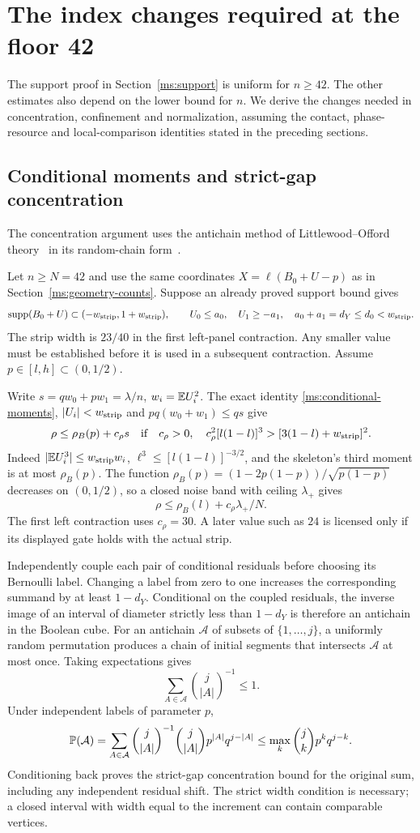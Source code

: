 \section{The index changes required at the floor 42}\label{ms:uniform-bridge}

The support proof in Section~\ref{ms:support} is uniform for $n\ge42$.
The other estimates also depend on the lower bound for $n$. We derive
the changes needed in concentration, confinement and normalization,
assuming the contact, phase-resource and local-comparison identities
stated in the preceding sections.

\subsection{Conditional moments and strict-gap concentration}
The concentration argument uses the antichain method of
Littlewood--Offord theory~\cite{Erdos1945} in its random-chain
form~\cite{Lubell1966}.

Let $n\ge N=42$ and use the same coordinates
$X=\ell(B_0+U-p)$ as in Section~\ref{ms:geometry-counts}. Suppose an
already proved support bound gives
\[
 \operatorname{supp}(B_0+U)\subset(-w_{\rm strip},1+w_{\rm strip}),\qquad
 U_0\le a_0,\quad U_1\ge-a_1,\quad
 a_0+a_1=d_Y\le d_0<w_{\rm strip}.
\]
The strip width is $23/40$ in the first left-panel contraction.
Any smaller value must be established before it is used in a subsequent
contraction. Assume $p\in[l,h]\subset(0,1/2)$.

Write $s=qw_0+pw_1=\lambda/n$, $w_i=\mathbb E U_i^2$. The exact identity
\eqref{ms:conditional-moments}, $|U_i|<w_{\rm strip}$ and $pq(w_0+w_1)\le qs$
give
\[
 \rho\le\rho_B(p)+c_\rho s
 \quad\hbox{if}\quad
 c_\rho>0,\quad c_\rho^2[l(1-l)]^3>[3(1-l)+w_{\rm strip}]^2.
\]
Indeed $|\mathbb E U_i^3|\le w_{\rm strip} w_i$,
$\ell^3\le[l(1-l)]^{-3/2}$, and the skeleton's third moment is at
most $\rho_B(p)$. The function $\rho_B(p)=(1-2p(1-p))/\sqrt{p(1-p)}$
decreases on $(0,1/2)$, so a closed noise band with ceiling
$\lambda_+$ gives
\[
 \rho\le\rho_B(l)+c_\rho\lambda_+/N.
\]
The first left contraction uses $c_\rho=30$. A later value such as $24$
is licensed only if its displayed gate holds with the actual strip.

Independently couple each pair of conditional residuals before choosing
its Bernoulli label. Changing a label from zero to one increases the
corresponding summand by at least $1-d_Y$. Conditional on the coupled
residuals, the inverse image of an interval of diameter strictly less
than $1-d_Y$ is therefore an antichain in the Boolean cube. For an
antichain $\mathcal A$ of subsets of $\{1,\ldots,j\}$, a uniformly
random permutation produces a chain of initial segments that intersects
$\mathcal A$ at most once. Taking expectations gives
\[
 \sum_{A\in\mathcal A}\binom{j}{|A|}^{-1}\le1.
\]
Under independent labels of parameter $p$,
\[
 \mathbb P(\mathcal A)=\sum_{A\in\mathcal A}
 \binom{j}{|A|}^{-1}\binom{j}{|A|}p^{|A|}q^{j-|A|}
 \le\max_k\binom jk p^kq^{j-k}.
\]
Conditioning back proves the strict-gap concentration bound for the
original sum, including any independent residual shift. The strict
width condition is necessary; a closed interval with width equal to the
increment can contain comparable vertices.

